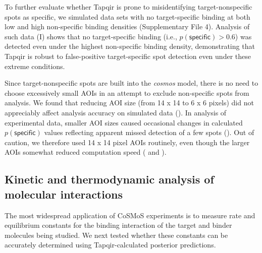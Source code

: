 To further evaluate whether Tapqir is prone to misidentifying target-nonspecific spots as specific, we  simulated data sets with no target-specific binding at both low and high non-specific binding densities (Supplementary File 4). Analysis of such data (I) shows that no target-specific binding (i.e., $p(\mathsf{specific}) > 0.6$) was detected even under the highest non-specific binding density, demonstrating that Tapqir is robust to false-positive target-specific spot detection even under these extreme conditions. 



Since target-nonspecific spots are built into the \emph{cosmos} model, there is no need to choose excessively small AOIs in an attempt to exclude non-specific spots from analysis. We found that reducing AOI size (from 14 x 14 to 6 x 6 pixels) did not appreciably affect analysis accuracy on simulated data (). In analysis of experimental data, smaller AOI sizes caused occasional changes in calculated $p(\mathsf{specific})$ values reflecting apparent missed detection of a few spots (). Out of caution, we therefore used 14 x 14 pixel AOIs routinely, even though the larger AOIs somewhat reduced computation speed ( and ).

\subsection{Kinetic and thermodynamic analysis of molecular interactions}

The most widespread application of CoSMoS experiments is to measure rate and equilibrium constants for the binding interaction of the target and binder molecules being studied.  We next tested whether these constants can be accurately determined using Tapqir-calculated posterior predictions. 

